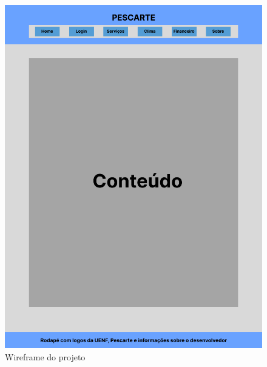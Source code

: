 \documentclass[a4paper]{abntex2}
\begin{document}
\begin{figure}[H]
    \centering
    \includegraphics[width=0.75\linewidth]{imagens/Wireframe-projeto.png}
    \caption{Wireframe do projeto}
    \label{fig:wireframe-projeto}
\end{figure}
\end{document}

